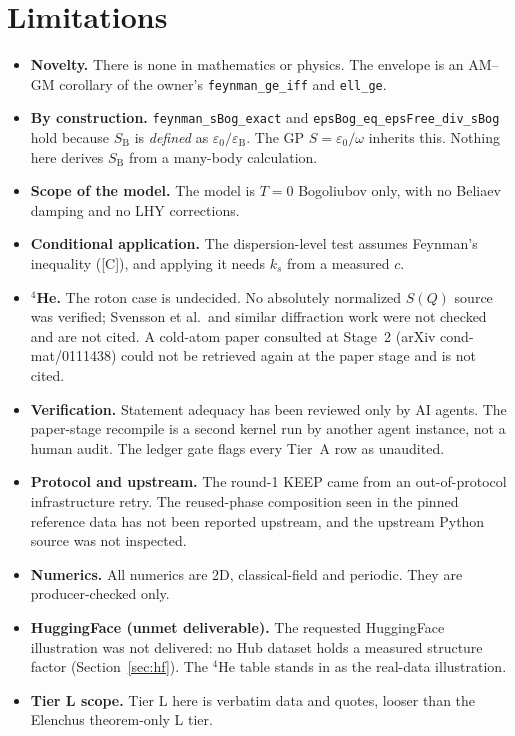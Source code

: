 \documentclass[11pt]{article}
\theoremstyle{remark}
\newcommand{\tier}[1]{\textsf{[#1]}}
\newcommand{\lean}[1]{\texttt{#1}}
\newcommand{\ks}{k_s}
\newcommand{\SB}{S_{\mathrm B}}
\newcommand{\eB}{\varepsilon_{\mathrm B}}
\begin{document}
\section{Limitations}\label{sec:limits}
\begin{itemize}
\item \textbf{Novelty.} There is none in mathematics or physics. The envelope is an AM--GM corollary of the owner's
\lean{feynman\_ge\_iff} and \lean{ell\_ge}.
\item \textbf{By construction.} \lean{feynman\_sBog\_exact} and \lean{epsBog\_eq\_epsFree\_div\_sBog} hold because
$\SB$ is \emph{defined} as $\varepsilon_0/\eB$. The GP $S=\varepsilon_0/\omega$ inherits this. Nothing here derives
$\SB$ from a many-body calculation.
\item \textbf{Scope of the model.} The model is $T=0$ Bogoliubov only, with no Beliaev damping and no LHY corrections.
\item \textbf{Conditional application.} The dispersion-level test assumes Feynman's inequality (\tier{C}), and applying
it needs $\ks$ from a measured $c$.
\item \textbf{$^4$He.} The roton case is undecided. No absolutely normalized $S(Q)$ source was verified; Svensson et
al.\ and similar diffraction work were not checked and are not cited. A cold-atom paper consulted at Stage~2 (arXiv
cond-mat/0111438) could not be retrieved again at the paper stage and is not cited.
\item \textbf{Verification.} Statement adequacy has been reviewed only by AI agents. The paper-stage recompile is a
second kernel run by another agent instance, not a human audit. The ledger gate flags every Tier~A row as unaudited.
\item \textbf{Protocol and upstream.} The round-1 KEEP came from an out-of-protocol infrastructure retry. The
reused-phase composition seen in the pinned reference data has not been reported upstream, and the upstream Python
source was not inspected.
\item \textbf{Numerics.} All numerics are 2D, classical-field and periodic. They are producer-checked only.
\item \textbf{HuggingFace (unmet deliverable).} The requested HuggingFace illustration was not delivered: no Hub dataset
holds a measured structure factor (Section~\ref{sec:hf}). The $^4$He table stands in as the real-data illustration.
\item \textbf{Tier L scope.} Tier L here is verbatim data and quotes, looser than the Elenchus theorem-only L tier.
\end{itemize}
\end{document}
